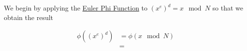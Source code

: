 \documentclass[../CryptoHW3.tex]{subfiles}
\begin{document}
\begin{flushleft}



  We begin by applying the \underline{Euler Phi Function} to $\left( x^e \right)^d = x \mod N$ so that we obtain the result

\begin{align*}
   \phi \left( \left( x^e \right)^d \right) &= \phi \left(  x \mod N \right) \\
   &=
\end{align*}




\end{flushleft}
\end{document}
